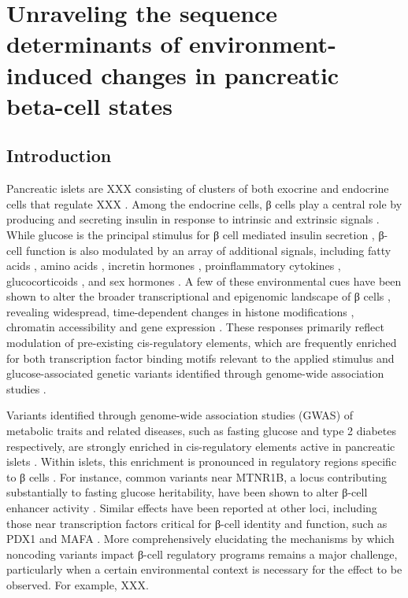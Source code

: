 \chapter{Unraveling the sequence determinants of environment-induced changes in pancreatic beta-cell states}
\label{chap:Unraveling environment-induced changes in beta-cells}

\section{Introduction}

Pancreatic islets are XXX consisting of clusters of both exocrine and endocrine cells that regulate XXX {}. Among the endocrine cells, β cells play a central role by producing and secreting insulin in response to intrinsic {} and extrinsic signals {}. While glucose is the principal stimulus for β cell mediated insulin secretion {}, β-cell function is also modulated by an array of additional signals, including fatty acids {}, amino acids {}, incretin hormones {}, proinflammatory cytokines {}, glucocorticoids {}, and sex hormones {}. A few of these environmental cues have been shown to alter the broader transcriptional and epigenomic landscape of β cells {}, revealing widespread, time-dependent changes in histone modifications {}, chromatin accessibility {} and gene expression {}. These responses primarily reflect modulation of pre-existing cis-regulatory elements, which are frequently enriched for both transcription factor binding motifs relevant to the applied stimulus and glucose-associated genetic variants identified through genome-wide association studies {}.

Variants identified through genome-wide association studies (GWAS) of metabolic traits and related diseases, such as fasting glucose {} and type 2 diabetes {} respectively, are strongly enriched in cis-regulatory elements active in pancreatic islets {}. Within islets, this enrichment is pronounced in regulatory regions specific to β cells {}. For instance, common variants near MTNR1B, a locus contributing substantially to fasting glucose heritability, have been shown to alter β-cell enhancer activity {}. Similar effects have been reported at other loci, including those near transcription factors critical for β-cell identity and function, such as PDX1 and MAFA {}. More comprehensively elucidating the mechanisms by which noncoding variants impact β-cell regulatory programs remains a major challenge, particularly when a certain environmental context is necessary for the effect to be observed. For example, XXX.

